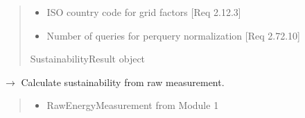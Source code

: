 \documentclass[letterpaper,10pt,english]{sphinxmanual}
\begin{document}
\begin{fulllineitems}
\begin{fulllineitems}
\begin{quote}
\begin{description}
\begin{itemize}
\item {} 
\sphinxAtStartPar
{} \textendash{} ISO country code for grid factors {[}Req 2.1\sphinxhyphen{}2.3{]}

\item {} 
\sphinxAtStartPar
{} \textendash{} Number of queries for per\sphinxhyphen{}query normalization {[}Req 2.7\sphinxhyphen{}2.10{]}

\end{itemize}

\sphinxAtStartPar
SustainabilityResult object

\end{description}\end{quote}

\end{fulllineitems}


\begin{fulllineitems}
\label{\detokenize{core.sustainability.calculator:core.sustainability.calculator.SustainabilityCalculator.calculate_from_raw}}
\pysigstartsignatures
\pysiglinewithargsret
{}
{\sphinxparamcomma {}\sphinxparamcomma {}}
{{ $\rightarrow$ {\hyperref[\detokenize{core.sustainability.calculator:core.sustainability.calculator.SustainabilityResult}]{}}}}
\pysigstopsignatures
\sphinxAtStartPar
Calculate sustainability from raw measurement.
\begin{quote}\begin{description}
\begin{itemize}
\item {} 
\sphinxAtStartPar
{} \textendash{} RawEnergyMeasurement from Module 1


\end{itemize}
\end{description}
\end{quote}
\end{fulllineitems}
\end{fulllineitems}
\end{document}
